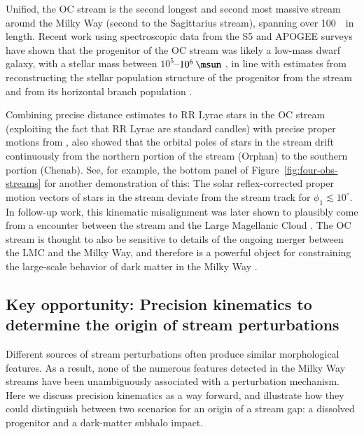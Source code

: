 \documentclass[final,5p,times,twocolumn,authoryear]{elsarticle}
\begin{document}
Unified, the OC stream is the second longest and second most massive stream around the
Milky Way (second to the Sagittarius stream), spanning over 100~\kpc\ in length.
Recent work using spectroscopic data from the S5 and APOGEE surveys have shown that the
progenitor of the OC stream was likely a low-mass dwarf galaxy, with a stellar mass
between $10^5$--$10^6~\unit{\msun}$ \citep{koposov:2023, hawkins:2023}, in line with
estimates from reconstructing the stellar population structure of the progenitor from
the stream \citep{mendelsohn:2022} and from its horizontal branch population \citep{prudil:2021}.

Combining precise distance estimates to RR Lyrae stars in the OC stream (exploiting the
fact that RR Lyrae are standard candles) with precise proper motions from \gaia,
\citet{koposov:2019} also showed that the orbital poles of stars in the stream drift
continuously from the northern portion of the stream (Orphan) to the southern portion
(Chenab).
See, for example, the bottom panel of Figure~\ref{fig:four-obs-streams} for another
demonstration of this: The solar reflex-corrected proper motion vectors of stars in the
stream deviate from the stream track for $\phi_1 \lesssim 10^\circ$.
In follow-up work, this kinematic misalignment was later shown to plausibly come from a
 encounter between the stream and the Large Magellanic Cloud \citep{erkal:2019}.
The OC stream is thought to also be sensitive to details of the ongoing merger
between the LMC and the Milky Way, and therefore is a powerful object for constraining
the large-scale behavior of dark matter in the Milky Way \citep{lilleengen:2023}.


\subsection{Key opportunity: Precision kinematics to determine the origin of stream perturbations}
\label{sec:xkinematics}
Different sources of stream perturbations often produce similar morphological features.
As a result, none of the numerous features detected in the Milky Way streams have been unambiguously associated with a  perturbation mechanism.
Here we discuss precision kinematics as a way forward, and illustrate how they could distinguish between two scenarios for an origin of a stream gap: a dissolved progenitor and a dark-matter subhalo impact.
\end{document}
